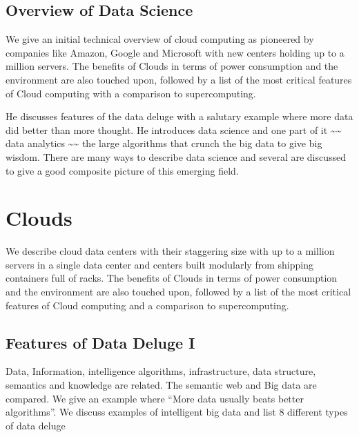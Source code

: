 \subsection{Overview of Data Science}\label{overview-1}

We give an initial technical overview of cloud computing as pioneered by
companies like Amazon, Google and Microsoft with new centers holding up
to a million servers. The benefits of Clouds in terms of power
consumption and the environment are also touched upon, followed by a
list of the most critical features of Cloud computing with a comparison
to supercomputing.

He discusses features of the data deluge with a salutary example where
more data did better than more thought. He introduces data science and
one part of it \textasciitilde{}\textasciitilde{} data analytics
\textasciitilde{}\textasciitilde{} the large algorithms that crunch the
big data to give big wisdom. There are many ways to describe data
science and several are discussed to give a good composite picture of
this emerging field.




\section{Clouds}\label{clouds}

We describe cloud data centers with their staggering size with up to a
million servers in a single data center and centers built modularly from
shipping containers full of racks. The benefits of Clouds in terms of
power consumption and the environment are also touched upon, followed by
a list of the most critical features of Cloud computing and a comparison
to supercomputing.





\subsection{Features of Data Deluge I}\label{features-of-data-deluge-i}

Data, Information, intelligence algorithms, infrastructure, data
structure, semantics and knowledge are related. The semantic web and Big
data are compared. We give an example where ``More data usually beats
better algorithms''. We discuss examples of intelligent big data and
list 8 different types of data deluge



